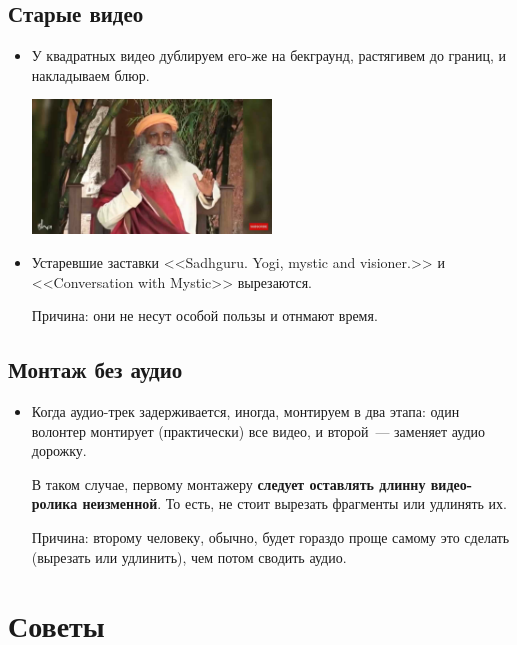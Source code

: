 \documentclass[
a4paper, %
12pt, %
article,
onecolumn, %
openany, %
]{memoir}
\begin{document}
\subsection{Старые видео}

\begin{itemize}

  \item У квадратных видео дублируем его-же на бекграунд, растягивем до границ, 
        и накладываем блюр.
        \begin{center} \includegraphics[width=0.5\textwidth]{tooWide}  \end{center}

  \item Устаревшие заставки <<Sadhguru. Yogi, mystic and visioner.>> и 
        <<Conversation with Mystic>> вырезаются.

        {\color{gray}Причина: они не несут особой пользы и отнмают время.}
\end{itemize}


\subsection{Монтаж без аудио}

\begin{itemize}
  \item Когда аудио-трек задерживается, иногда, монтируем в два
        этапа: один волонтер монтирует (практически) все видео, и
        второй~--- заменяет аудио дорожку.

        В таком случае, первому монтажеру \textbf{следует оставлять
          длинну видео-ролика неизменной}. То есть, не стоит вырезать
        фрагменты или удлинять их.

        Причина: второму человеку, обычно, будет гораздо проще
        самому это сделать (вырезать или удлинить), чем потом сводить аудио.
\end{itemize}

\newpage
\section{Советы}\label{advices}
\end{document}
